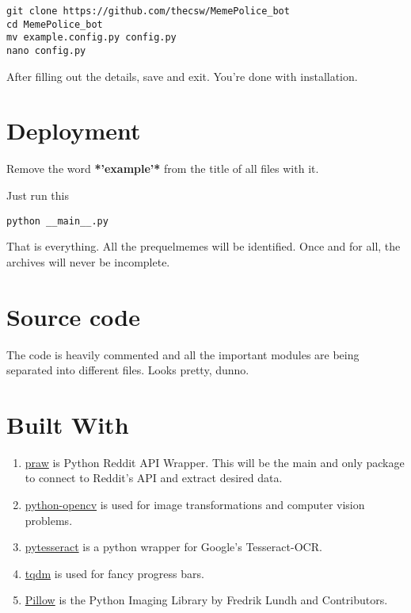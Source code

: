 \documentclass[11pt]{article}
\begin{document}
\begin{verbatim}
git clone https://github.com/thecsw/MemePolice_bot
cd MemePolice_bot
mv example.config.py config.py
nano config.py
\end{verbatim}

After filling out the details, save and exit. You're done with installation.

\section{Deployment}
\label{sec-3}

Remove the word \textbf{*'example'*} from the title of all files with it.

Just run this

\begin{verbatim}
python __main__.py
\end{verbatim}

That is everything. All the prequelmemes will be identified. Once and for all,
the archives will never be incomplete.

\section{Source code}
\label{sec-4}

The code is heavily commented and all the important modules are being separated into different files. Looks pretty, dunno.

\section{Built With}
\label{sec-5}
\begin{enumerate}
\item \href{https://github.com/praw-dev/praw}{praw} is Python Reddit API Wrapper. This will be the main and only package to
connect to Reddit's API and extract desired data.
\item \href{https://pypi.python.org/pypi/opencv-python}{python-opencv} is used for image transformations and computer vision problems.
\item \href{https://pypi.python.org/pypi/pytesseract}{pytesseract} is a python wrapper for Google's Tesseract-OCR.
\item \href{https://pypi.python.org/pypi/tqdm}{tqdm} is used for fancy progress bars.
\item \href{https://pillow.readthedocs.io/en/latest/}{Pillow} is the Python  Imaging Library by Fredrik Lundh and Contributors.
\end{enumerate}
\end{document}
